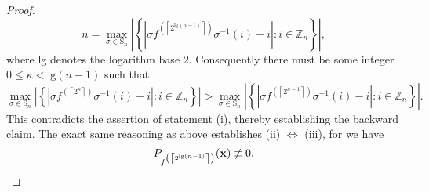 \begin{proof}
\begin{equation}
n=\max_{\sigma\in\text{S}_{n}}\left|\left\{ |\sigma f^{(\left\lceil 2^{\text{lg}(n-1)}\right\rceil )}\sigma^{-1}(i)-i|:i\in\mathbb{Z}_{n}\right\} \right|,
\end{equation}
where lg denotes the logarithm base $2$. Consequently there must
be some integer $0\le\kappa<\text{lg}(n-1)$ such that 
\begin{equation}
\max_{\sigma\in\text{S}_{n}}\left|\left\{ |\sigma f^{(\left\lceil 2^{\kappa}\right\rceil )}\sigma^{-1}(i)-i|:i\in\mathbb{Z}_{n}\right\} \right|>\max_{\sigma\in\text{S}_{n}}\left|\left\{ |\sigma f^{(\left\lceil 2^{\kappa-1}\right\rceil )}\sigma^{-1}(i)-i|:i\in\mathbb{Z}_{n}\right\} \right|.
\end{equation}
This contradicts the assertion of statement (i), thereby
establishing the backward claim. 
The exact same reasoning as above establishes (ii) $\iff$ (iii), for we have
\begin{equation}
        P_{f^{\left(\left\lceil 2^{\text{lg}(n-1)}\right\rceil \right)}} ({\bf x}) \not\equiv 0. 
\end{equation}
\end{proof}

